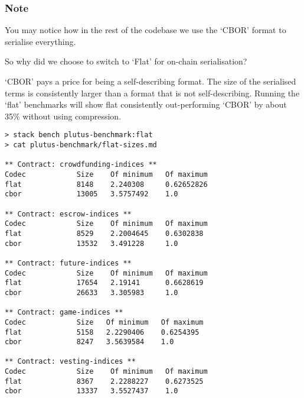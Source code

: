 \documentclass[a4paper]{article}
\begin{document}
\begin{appendices}
\subsubsection{Note}

You may notice how in the rest of the codebase we use the `CBOR' format to serialise
everything.

So why did we choose to switch to `Flat' for on-chain serialisation?

`CBOR' pays a price for being a self-describing format. The size of the serialised
terms is consistently larger than a format that is not self-describing. Running the
`flat' benchmarks will show flat consistently out-performing `CBOR' by about 35\%
without using compression.

\begin{verbatim}
> stack bench plutus-benchmark:flat
> cat plutus-benchmark/flat-sizes.md

** Contract: crowdfunding-indices **
Codec            Size    Of minimum   Of maximum
flat             8148    2.240308     0.62652826
cbor             13005   3.5757492    1.0

** Contract: escrow-indices **
Codec            Size    Of minimum   Of maximum
flat             8529    2.2004645    0.6302838 
cbor             13532   3.491228     1.0

** Contract: future-indices **
Codec            Size    Of minimum   Of maximum
flat             17654   2.19141      0.6628619 
cbor             26633   3.305983     1.0

** Contract: game-indices **
Codec            Size   Of minimum   Of maximum
flat             5158   2.2290406    0.6254395 
cbor             8247   3.5639584    1.0

** Contract: vesting-indices **
Codec            Size    Of minimum   Of maximum
flat             8367    2.2288227    0.6273525 
cbor             13337   3.5527437    1.0
\end{verbatim}

\end{appendices}


\end{document}
